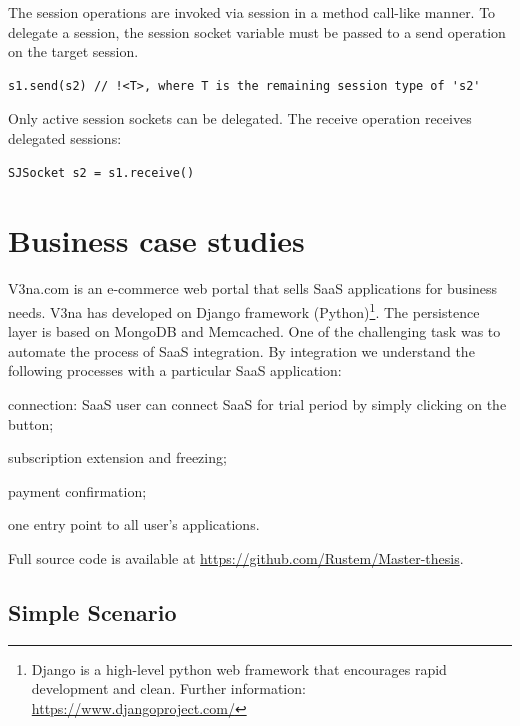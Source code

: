 \documentclass[a4paper]{easychair}
\begin{document}
The session operations are invoked via session in a method call-like manner. To delegate a session, the session socket variable must be passed to a send operation on the target session.

\begin{lstlisting}
s1.send(s2) // !<T>, where T is the remaining session type of 's2'
\end{lstlisting}


Only active session sockets can be delegated. The receive operation receives delegated sessions:

\begin{lstlisting}
SJSocket s2 = s1.receive()
\end{lstlisting}

\section{Business case studies}
\label{sect:impl}

V3na.com is an e-commerce web portal that sells SaaS applications for business needs. V3na has developed on Django framework (Python)\footnote{ Django is a high-level python web framework that encourages rapid development and clean. Further information: \url{https://www.djangoproject.com/}}. The persistence layer is based on MongoDB and Memcached. One of the challenging task was to automate the process of SaaS integration. By integration we understand the following processes with a particular SaaS application:

\begin{compactitem}
\item  connection: SaaS user can connect SaaS for trial period by simply clicking on the button;

\item  subscription extension and freezing;

\item  payment confirmation;

\item one entry point to all user's applications.
\end{compactitem}
Full source  code is available at \url{https://github.com/Rustem/Master-thesis}.

\subsection{Simple Scenario}
\end{document}
